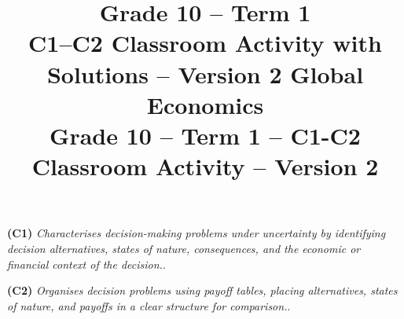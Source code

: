 \makeatletter
{}
\makeatother







\title{Grade 10 -- Term 1 \\ C1--C2 Classroom Activity with Solutions -- Version 2}
\author{}
\date{}

\pagestyle{empty}

\geometry{
	margin=0.3in,
	bottom=0.3in
}


\title{\vspace{-15mm} \textbf{Global Economics}\\
	Grade 10 -- Term 1 -- C1-C2 Classroom Activity -- Version 2}
\author{}
\date{}
\pagestyle{empty}



	\maketitle\thispagestyle{empty}
	\vspace{-22mm}

\textbf{(C1)} \textit{Characterises decision-making problems under uncertainty by identifying decision alternatives, states of nature, consequences, and the economic or financial context of the decision.}. 

\textbf{(C2)} \textit{Organises decision problems using payoff tables, placing alternatives, states of nature, and payoffs in a clear structure for comparison.}. \vspace{-3mm}
